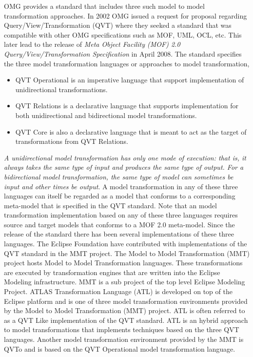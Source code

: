 OMG provides a standard that includes three such model to model transformation
approaches. In 2002 OMG issued a request for proposal regarding
Query/View/Transformation (QVT)\cite{QVT} where they seeked a standard that was
compatible with other OMG specifications such as MOF, UML, OCL, etc. This later
lead to the release of \textit{Meta Object Facility (MOF) 2.0
Query/View/Transformation Specification} in April 2008. The standard specifies
the three model transformation languages or approaches to model transformation, 
\begin{itemize}
  \item QVT Operational is an imperative language that support implementation of
  unidirectional transformations.
  \item QVT Relations is a declarative language that supports implementation for
  both unidirectional and bidirectional model transformations.
  \item QVT Core is also a declarative language that is meant to act as the
  target of transformations from QVT Relations.
\end{itemize}
\textit{A unidirectional model transformation has only one mode of execution:
that is, it always takes the same type of input and produces the same type of
output. For a bidirectional model transformation, the same type of model can
sometimes be input and other times be output}\cite{WikiMT}. A model
transformation in any of these three languages can itself be regarded as a
model that conforms to a corresponding meta-model that is specified in the QVT
standard. Note that an model transformation implementation based on any of
these three languages requires source and target models that conforms to a MOF
2.0 meta-model. Since the release of the standard there has been several
implementations of these three languages. The Eclipse Foundation have
contributed with implementations of the QVT standard in the MMT project. The
Model to Model Transformation (MMT) project hosts Model to Model Transformation
languages. These transformations are executed by transformation engines that
are written into the Eclipse Modeling infrastructure. MMT is a sub project of
the top level Eclipse Modeling Project\cite{EMP}. ATLAS Transformation Language
(ATL)\cite{Jouault2008} is developed on top of the Eclipse platform and is one
of three model transformation environments provided by the Model to Model
Transformation (MMT) project\cite{MMT}. ATL is often referred to as a QVT Like
implementation of the QVT standard. ATL is an hybrid approach to model
transformations that implements techniques based on the three QVT languages.
Another model transformation environment provided by the MMT is
QVTo\cite{dvorak2008model} and is based on the QVT Operational model
transformation language.

